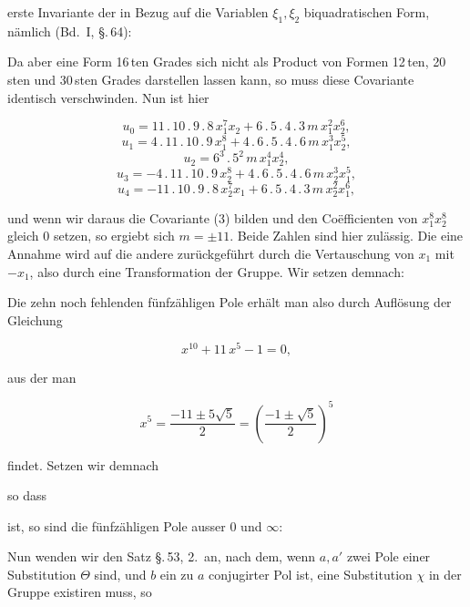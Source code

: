 erste Invariante der in Bezug auf die Variablen $\xi_1, \xi_2$ biquadratischen
 Form, n\"amlich (Bd.\ I, \S.\,64):


Da aber eine Form 16\,ten Grades sich nicht als Product von
Formen 12\,ten, 20\,sten und 30\,sten Grades darstellen lassen kann, so
muss diese Covariante identisch verschwinden. Nun ist hier

\[
u_0 = 11\,.\,10\,.\,9\,.\,8\,x_1^7x_2 + 6\,.\,5\,.\,4\,.\,3\,m\,x_1^2x_2^6,
\]
\[
u_1 = 4\,.\,11\,.\,10\,.\,9\,x_1^8 + 4\,.\,6\,.\,5\,.\,4\,.\,6\,m\,x_1^3x_2^5,
\]
\[
u_2 = 6^3\,.\,5^2\,m\,x_1^4x_2^4,
\]
\[
u_3 = -4\,.\,11\,.\,10\,.\,9\,x_2^8 + 4\,.\,6\,.\,5\,.\,4\,.\,6\,m\,x_2^3x_1^5,
\]
\[
u_4 = -11\,.\,10\,.\,9\,.\,8\,x_2^7x_1 + 6\,.\,5\,.\,4\,.\,3\,m\,x_2^2x_1^6,
\]

und wenn wir daraus die Covariante (3) bilden und den Co\"efficienten
 von $x_1^8x_2^8$ gleich 0 setzen, so ergiebt sich $m = \pm 11$.
Beide Zahlen sind hier zul\"assig. Die eine Annahme wird auf
die andere zur\"uckgef\"uhrt durch die Vertauschung von $x_1$ mit
$-x_1$, also durch eine Transformation der Gruppe. Wir setzen
demnach:


Die zehn noch fehlenden f\"unfz\"ahligen Pole erh\"alt man also
durch Aufl\"osung der Gleichung

\[
x^{10} + 11\,x^5 - 1 = 0,
\]

aus der man

\[
x^5 = \frac{-11 \pm 5\sqrt5}{2} = \left(\frac{-1 \pm \sqrt5}{2}\right)^5
\]

findet. Setzen wir demnach


so dass


ist, so sind die f\"unfz\"ahligen Pole ausser 0 und $\infty$:


Nun wenden wir den Satz \S.\,53, 2.\ an, nach dem, wenn $a, a'$
zwei Pole einer Substitution $\Theta$ sind, und $b$ ein zu $a$ conjugirter
Pol ist, eine Substitution $\chi$ in der Gruppe existiren muss, so
